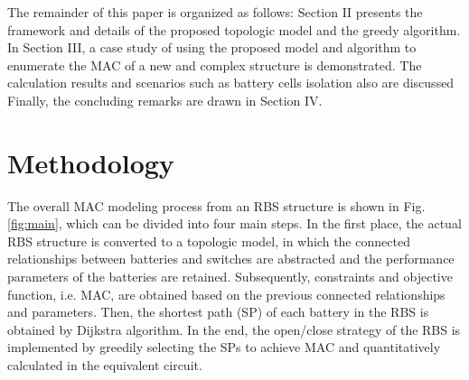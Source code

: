 \documentclass{article}
\begin{document}
The remainder of this paper is organized as follows:
Section II presents the framework and details of the proposed topologic model and the greedy algorithm.
In Section III, a case study of using the proposed model and algorithm to enumerate the MAC of a new and complex structure is demonstrated.
The calculation results and scenarios such as battery cells isolation also are discussed
Finally, the concluding remarks are drawn in Section IV.


\section{Methodology}

The overall MAC modeling process from an RBS structure is shown in Fig. \ref{fig:main}, which can be divided into four main steps.
In the first place, the actual RBS structure is converted to a topologic model, in which the connected relationships between batteries and switches are abstracted and the performance parameters of the batteries are retained.
Subsequently, constraints and objective function, i.e. MAC, are obtained based on the previous connected relationships and parameters.
Then, the shortest path (SP) of each battery in the RBS is obtained by Dijkstra algorithm.
In the end, the open/close strategy of the RBS is implemented by greedily selecting the SPs to achieve MAC and quantitatively calculated in the equivalent circuit.
\end{document}
